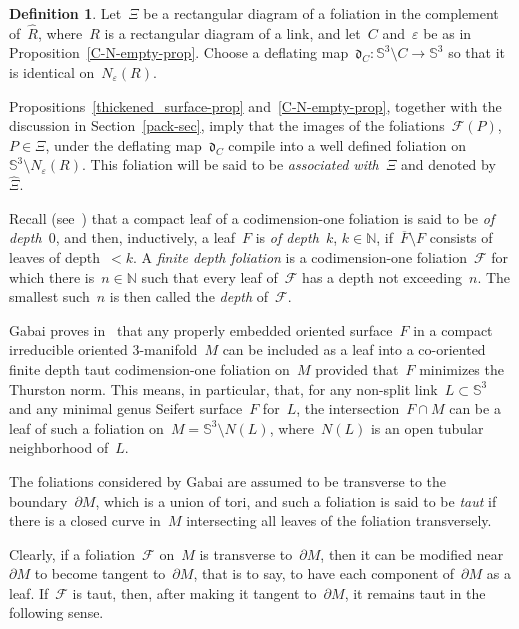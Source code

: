 \documentclass{amsart}
\theoremstyle{theorem}
\theoremstyle{remark}
\theoremstyle{definition}
\newtheorem{defi}[theo]{Definition}
\numberwithin{equation}{section}
\numberwithin{figure}{section}
\begin{document}
\begin{defi}
Let~$\Xi$ be a rectangular diagram of a foliation in the complement of~$\widehat R$,
where~$R$ is a rectangular diagram of a link, and let~$C$ and~$\varepsilon$ be as in Proposition~\ref{C-N-empty-prop}.
Choose a deflating map~$\mathfrak d_C:\mathbb S^3\setminus C\rightarrow\mathbb S^3$ so
that it is identical on~$N_\varepsilon(R)$.

Propositions~\ref{thickened_surface-prop} and~\ref{C-N-empty-prop}, together with the discussion in
Section~\ref{pack-sec}, imply that the images of the foliations~$\mathscr F(P)$, $P\in\Xi$,
under the deflating map~$\mathfrak d_C$ compile into a well defined foliation on~$\mathbb S^3\setminus N_\varepsilon(R)$.
This foliation will be said to be \emph{associated with~$\Xi$} and denoted by~$\widehat\Xi$.
\end{defi}

Recall (see~\cite{gabai83}) that a compact leaf of a codimension-one foliation is said to be \emph{of depth~$0$},
and then, inductively, a leaf~$F$ is \emph{of depth~$k$}, $k\in\mathbb N$, if~$\overline F\setminus F$
consists of leaves of depth~$<k$. A \emph{finite depth foliation} is a codimension-one foliation~$\mathscr F$
for which there is~$n\in\mathbb N$ such that every leaf of~$\mathscr F$ has a depth not exceeding~$n$.
The smallest such~$n$ is then called the \emph{depth} of~$\mathscr F$.

Gabai proves in~\cite{gabai83} that any properly embedded oriented surface~$F$ in a compact irreducible oriented
$3$-manifold~$M$ can be included as a leaf into a co-oriented finite depth taut codimension-one foliation on~$M$
provided that~$F$ minimizes the Thurston norm. This means, in particular, that, for any non-split link~$L\subset\mathbb S^3$
and any minimal genus Seifert surface~$F$ for~$L$, the intersection~$F\cap M$ can be a leaf of such a foliation
on~$M=\mathbb S^3\setminus N(L)$, where~$N(L)$ is an open tubular neighborhood of~$L$.

The foliations considered by Gabai are assumed to be transverse to the boundary~$\partial M$, which is a union of tori,
and such a foliation is said to be \emph{taut} if there is a closed curve in~$M$ intersecting all leaves
of the foliation transversely.

Clearly, if a foliation~$\mathscr F$ on~$M$ is transverse to~$\partial M$, then it can be modified
near~$\partial M$ to become tangent to~$\partial M$, that is to say, to have each component of~$\partial M$
as a leaf. If~$\mathscr F$ is taut, then, after making it tangent to~$\partial M$, it remains taut in
the following sense.
\end{document}
